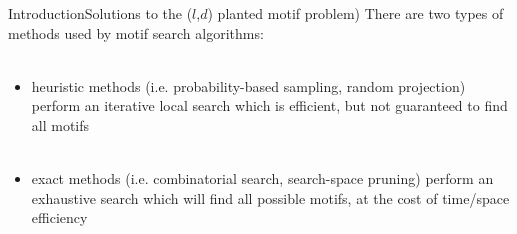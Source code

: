 \documentclass[pdf,xcolor={dvipsnames}]{beamer}
\begin{document}
	\begin{frame}{Introduction}{Solutions to the ($l$,$d$) planted motif problem)}
		There are two types of methods used by motif search algorithms:\\ \ \\
		\begin{itemize}
		\item { heuristic methods} (i.e. probability-based sampling, random projection)
		perform an iterative local search which is efficient, but not guaranteed to find all motifs
		\\ \ \\
		\item { exact methods} (i.e. combinatorial search, search-space pruning)
		perform an exhaustive search which will {find all possible motifs, at the cost of time/space efficiency}
		\end{itemize}
		\end{frame}
\end{document}
